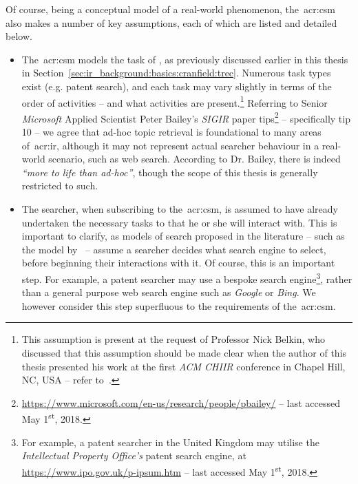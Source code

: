 \noindent
{} Of course, being a conceptual model of a real-world phenomenon, the~\gls{acr:csm} also makes a number of key assumptions, each of which are listed and detailed below.

\begin{itemize}
    
    \item{The~\gls{acr:csm} models the task of , as previously discussed earlier in this thesis in Section~\ref{sec:ir_background:basics:cranfield:trec}. Numerous task types exist (e.g. patent search), and each task may vary slightly in terms of the order of activities -- and what activities are present.\footnote{This assumption is present at the request of Professor Nick Belkin, who discussed that this assumption should be made clear when the author of this thesis presented his work at the first \emph{ACM CHIIR} conference in Chapel Hill, NC, USA -- refer to~\cite{maxwell2016dc}.} Referring to Senior \emph{Microsoft} Applied Scientist Peter Bailey's \emph{SIGIR} paper tips\footnote{\url{https://www.microsoft.com/en-us/research/people/pbailey/} -- last accessed May 1\textsuperscript{st}, 2018.} -- specifically tip 10 -- we agree that ad-hoc topic retrieval is foundational to many areas of~\gls{acr:ir}, although it may not represent actual searcher behaviour in a real-world scenario, such as web search. According to Dr. Bailey, there is indeed \emph{``more to life than ad-hoc''}, though the scope of this thesis is generally restricted to such.}
    
    \item{The searcher, when subscribing to the~\gls{acr:csm}, is assumed to have already undertaken the necessary tasks to  that he or she will interact with. This is important to clarify, as models of search proposed in the literature -- such as the model by~\cite{thomas2014modelling_behaviour} -- assume a searcher decides what search engine to select, before beginning their interactions with it. Of course, this is an important step. For example, a patent searcher may use a bespoke search engine\footnote{For example, a patent searcher in the United Kingdom may utilise the \emph{Intellectual Property Office's} patent search engine, at \url{https://www.ipo.gov.uk/p-ipsum.htm} -- last accessed May 1\textsuperscript{st}, 2018.}, rather than a general purpose web search engine such as \emph{Google} or \emph{Bing}. We however consider this step superfluous to the requirements of the~\gls{acr:csm}.}
    

\end{itemize}

